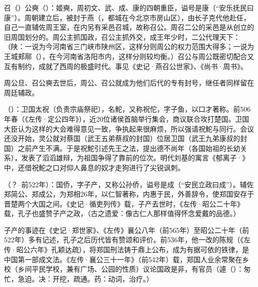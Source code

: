 召（）公奭（）：姬奭，周初文、武、成、康的四朝重臣，谥号是康（“安乐抚民曰康”）。周朝建立后，被封于燕（，都城在今北京市房山区），由长子克代他赴任，自己一直辅佐周王室，在内另有采邑召城，故称召公。周召二公的采邑是从创立的旧周国划分的。周公主抓国政，召公主抓外交，成王年少时，二公代理天下：（陕：一说为今河南省三门峡市陕州区，这样分则周公的权力范围大得多；一说为王城郏鄏（），在今河南省洛阳市内，这样分则较均衡。）召公与周公既密切配合又互有制约，成就了西周的极盛时代。事见《史记·燕召公世家》、《尚书·周书》。

周公旦、召公奭去世后，周公、召公就成为他们后代的专有封号，继任者同样留在周廷辅政。%

（）：卫国太祝（负责宗庙祭祀），名鮀，又称祝佗，字子鱼，以口才著称。前506年春（《左传·定公四年》），近20位诸侯首脑举行集会，商议联合攻打楚国。卫国大臣认为这样的大会难得意见一致，争执起来很麻烦，所以强请祝鮀与同行。会议还没开始，灵公就对蔡国（武王五弟蔡叔的封国）位居卫国（武王九弟康叔的封国）之前产生不满。于是祝鮀引述先王之法，提出德不尚年（各国始祖的长幼关系），发表了滔滔雄辩，为祖国争得了靠前的位次。明代刘基的寓言《郁离子·》中，还借祝鮀之口对仰人鼻息的奴才走狗进行了尖锐讽刺。

（？--前522年）：国侨，字子产，又称公孙侨，谥号是成（“安民立政曰成”）。辅佐郑简公、郑成公，为郑相26年，以仁智著称，内惠于民，外善辞令，使郑国安存于晋楚两个大国之间。《史记·循吏列传》载，子产去世时，《左传·昭公二十年》载，孔子也盛赞子产之政，（古之遗爱：像古仁人那样值得怀念爱戴的品德。）%

子产的事迹在《史记·郑世家》、《左传》襄公八年（前565年）至昭公二十年（前522年）多有记述，孔子之后历代皆有赞颂和评价。前536年，他一改的陈规（《左传·昭公六年》孔颖达疏），将郑国刑法铸于鼎上公布，成为有据可依的铁律，是中国第一部成文法。《左传·襄公三十一年》（前542年）载，郑国人业余常聚在乡校（乡间平民学校，兼有广场、公园的性质）议论国政是非，有官员（遽（）：匆忙，急迫。决：开挖，疏通。药：动词，治疗。）

